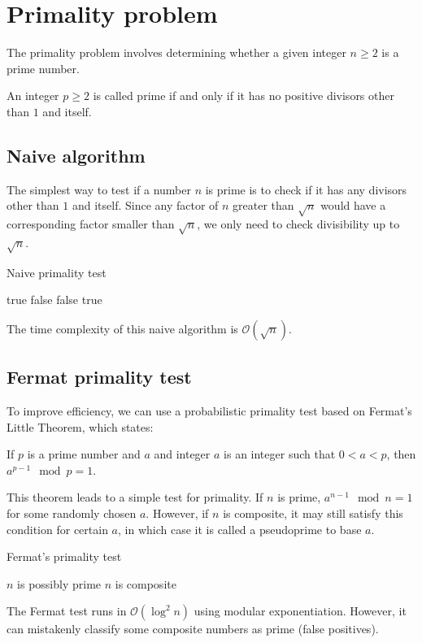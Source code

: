 \section{Primality problem}

The primality problem involves determining whether a given integer $n\geq 2$ is a prime number.
\begin{definition}
    An integer $p\geq 2$ is called prime if and only if it has no positive divisors other than $1$ and itself. 
\end{definition}

\subsection{Naive algorithm}
The simplest way to test if a number $n$ is prime is to check if it has any divisors other than $1$ and itself.
Since any factor of $n$ greater than $\sqrt{n}$ would have a corresponding factor smaller than $\sqrt{n}$, we only need to check divisibility up to $\sqrt{n}$. 
\begin{algorithm}[H]
    \caption{Naive primality test}
    \begin{algorithmic}[1]
            \State \Return true 
        \EndIf 
            \State \Return false 
        \EndIf 
                \State \Return false 
            \EndIf 
        \EndFor 
        \State \Return true 
    \end{algorithmic}
\end{algorithm} 
The time complexity of this naive algorithm is $\mathcal{O}(\sqrt{n})$.

\subsection{Fermat primality test}
To improve efficiency, we can use a probabilistic primality test based on Fermat's Little Theorem, which states:
\begin{theorem}[Fermat]
    If $p$ is a prime number and $a$ and integer $a$ is an integer such that $0<a<p$, then $a^{p-1}\mod p= 1$. 
\end{theorem}
This theorem leads to a simple test for primality.
If $n$ is prime, $a^{n-1}\mod n= 1$ for some randomly chosen $a$. 
However, if $n$ is composite, it may still satisfy this condition for certain $a$, in which case it is called a pseudoprime to base $a$.
\begin{algorithm}[H]
    \caption{Fermat's primality test}
    \begin{algorithmic}[1]
            \State $n$ is possibly prime 
        \Else 
            \State $n$ is composite
        \EndIf
    \end{algorithmic}
\end{algorithm} 
The Fermat test runs in $\mathcal{O}(\log^2n)$ using modular exponentiation. 
However, it can mistakenly classify some composite numbers as prime (false positives).


